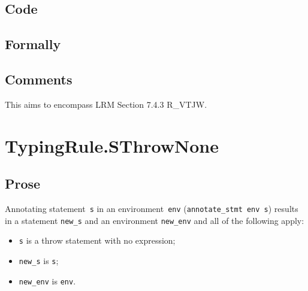 \documentclass{book}
\newcommand\Ignore[0]{\texttt{\_}}
\newcommand\annotateexpr[1]{\textsf{annotate\_expr}(#1)}
\newcommand\annotatestmt[1]{\texttt{annotate\_stmt}(#1)}
\newcommand\tenv[0]{\texttt{env}}
\newcommand\newenv[0]{\texttt{new\_env}}
\newcommand\veone[0]{\texttt{e1}}
\newcommand\vetwo[0]{\texttt{e2}}
\newcommand\vs[0]{\texttt{s}}
\newcommand\vtone[0]{\texttt{t1}}
\newcommand\vttwo[0]{\texttt{t2}}
\newcommand\news[0]{\texttt{new\_s}}
\newcommand\dir[0]{\texttt{dir}}
\begin{document}
  \subsection{Code}

\begin{emptyformal}
    \subsection{Formally}
\end{emptyformal}

\subsection{Comments}
    This aims to encompass LRM Section 7.4.3 R\_VTJW.
 

\section{TypingRule.SThrowNone \label{sec:TypingRule.SThrowNone}}

  \subsection{Prose}
Annotating statement~\texttt{s} in an environment~\texttt{env}
(\texttt{annotate\_stmt env s}) results in a statement \texttt{new\_s} and an
environment \texttt{new\_env} and all of the following apply:
   \begin{itemize}
   \item \texttt{s} is a throw statement with no expression;
   \item \texttt{new\_s} is \texttt{s};
   \item \texttt{new\_env} is \texttt{env}.
   \end{itemize}
\end{document}
